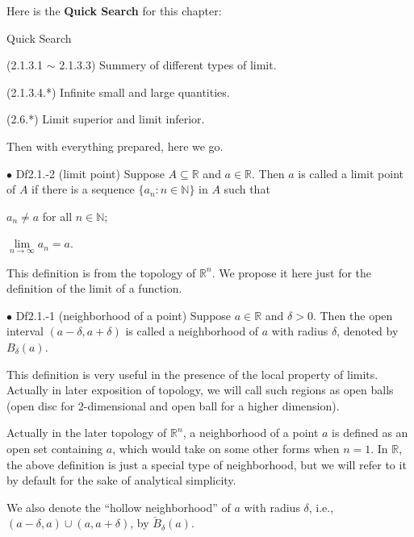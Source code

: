 \documentclass{article}
\begin{document}
Here is the \textbf{Quick Search} for this chapter:
\begin{Th}{Quick Search}
    \begin{compactdesc}
        \item[] (2.1.3.1 $\sim$ 2.1.3.3) Summery of different types of limit.
        \item[] (2.1.3.4.*) Infinite small and large quantities.
        \item[] (2.6.*) Limit superior and limit inferior.
    \end{compactdesc}
\end{Th}

Then with everything prepared, here we go.

\begin{Df}{$\bullet$ Df2.1.-2 (limit point)}
    Suppose $A\subseteq\mathbb{R}$ and $a\in\mathbb{R}$. Then $a$ is called a limit point of $A$ if there is a sequence $\{a_n:n\in\mathbb{N}\}$ in $A$ such that
    \begin{compactenum}
        \item $a_n\neq a$ for all $n\in\mathbb{N}$;
        \item $\lim\limits_{n\rightarrow\infty}a_n = a$.
    \end{compactenum}
\end{Df}

\begin{Rmk}{}
    This definition is from the topology of $\mathbb{R}^n$. We propose it here just for the definition of the limit of a function.
\end{Rmk}

\begin{Df}{$\bullet$ Df2.1.-1 (neighborhood of a point)}
    Suppose $a\in\mathbb{R}$ and $\delta>0$. Then the open interval $(a-\delta, a+\delta)$ is called a neighborhood of $a$ with radius $\delta$, denoted by $B_\delta(a)$.
\end{Df}

\begin{Rmk}{}
    \begin{compactitem}
        \item This definition is very useful in the presence of the local property of limits. Actually in later exposition of topology, we will call such regions as open balls (open disc for 2-dimensional and open ball for a higher dimension).
        \textcolor{Df}{\item Actually in the later topology of $\mathbb{R}^n$, a neighborhood of a point $a$ is defined as an open set containing $a$, which would take on some other forms when $n=1$. In $\mathbb{R}$, the above definition is just a special type of neighborhood, but we will refer to it by default for the sake of analytical simplicity. 
        \item We also denote the ``hollow neighborhood'' of $a$ with radius $\delta$, i.e., $(a-\delta, a)\cup(a, a+\delta)$, by $\check{B}_\delta(a)$.}
    \end{compactitem}
\end{Rmk}
\end{document}
